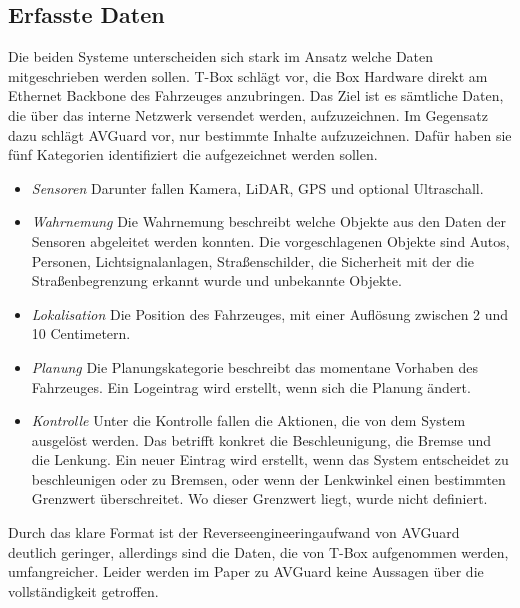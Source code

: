 \documentclass[conference,compsoc,final,a4paper]{IEEEtran}
\begin{document}
\subsection{Erfasste Daten}

Die beiden Systeme unterscheiden sich stark im Ansatz welche Daten mitgeschrieben werden sollen.
T-Box schlägt vor, die Box Hardware direkt am Ethernet Backbone des Fahrzeuges anzubringen.
Das Ziel ist es sämtliche Daten, die über das interne Netzwerk versendet werden, aufzuzeichnen.
Im Gegensatz dazu schlägt AVGuard vor, nur bestimmte Inhalte aufzuzeichnen.
Dafür haben sie fünf Kategorien identifiziert die aufgezeichnet werden sollen.\\
\begin{itemize}
  \item\emph{Sensoren} Darunter fallen Kamera, \ac{LiDAR}, \ac{GPS} und optional Ultraschall.\\
  \item\emph{Wahrnemung} Die Wahrnemung beschreibt welche Objekte aus den Daten der Sensoren abgeleitet werden konnten.
    Die vorgeschlagenen Objekte sind Autos, Personen, Lichtsignalanlagen, Straßenschilder,
    die Sicherheit mit der die Straßenbegrenzung erkannt wurde und unbekannte Objekte.\\
  \item\emph{Lokalisation} Die Position des Fahrzeuges, mit einer Auflösung zwischen 2 und 10 Centimetern.\\
  \item\emph{Planung} Die Planungskategorie beschreibt das momentane Vorhaben des Fahrzeuges.
    Ein Logeintrag wird erstellt, wenn sich die Planung ändert.\\
  \item\emph{Kontrolle} Unter die Kontrolle fallen die Aktionen, die von dem System ausgelöst werden.
    Das betrifft konkret die Beschleunigung, die Bremse und die Lenkung. 
    Ein neuer Eintrag wird erstellt, wenn das System entscheidet zu beschleunigen oder zu Bremsen,
    oder wenn der Lenkwinkel einen bestimmten Grenzwert überschreitet. Wo dieser Grenzwert liegt, wurde nicht definiert.
\end{itemize}

Durch das klare Format ist der Reverseengineeringaufwand von AVGuard deutlich geringer, allerdings sind die Daten, die
von T-Box aufgenommen werden, umfangreicher. Leider werden im Paper zu AVGuard keine Aussagen über die vollständigkeit getroffen.
\end{document}
